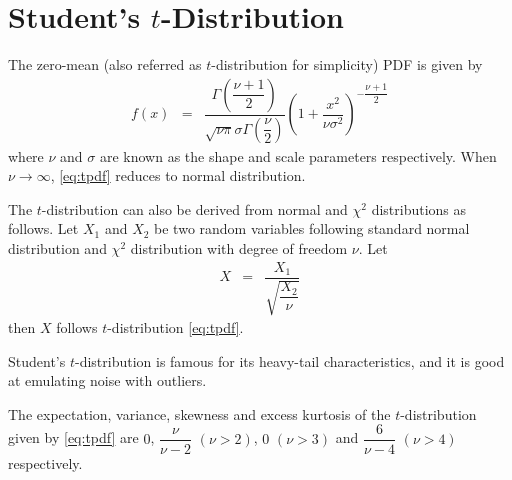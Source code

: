 \section{Student's $t$-Distribution}

The zero-mean  (also referred as $t$-distribution for simplicity) PDF is given by
\begin{eqnarray}
	f(x) &=& \dfrac{\Gamma\left(\dfrac{\nu+1}{2}\right)}{\sqrt{\nu\pi}\sigma\Gamma\left(\dfrac{\nu}{2}\right)}\left(1+\dfrac{x^2}{\nu\sigma^2}\right)^{-\dfrac{\nu+1}{2}} \label{eq:tpdf}
\end{eqnarray}
where $\nu$ and $\sigma$ are known as the shape and scale parameters respectively. When $\nu\rightarrow\infty$, \eqref{eq:tpdf} reduces to normal distribution. 

The $t$-distribution can also be derived from normal and $\chi^2$ distributions as follows. Let $X_1$ and $X_2$ be two random variables following standard normal distribution and $\chi^2$ distribution with degree of freedom $\nu$. Let
\begin{eqnarray}
	X &=& \dfrac{X_1}{\sqrt{\dfrac{X_2}{\nu}}} \nonumber
\end{eqnarray}
then $X$ follows $t$-distribution \eqref{eq:tpdf}.

Student's $t$-distribution is famous for its heavy-tail characteristics, and it is good at emulating noise with outliers.

The expectation, variance, skewness and excess kurtosis of the $t$-distribution given by \eqref{eq:tpdf} are $0$, $\dfrac{\nu}{\nu-2}$ $(\nu>2)$, $0$ $(\nu>3)$ and $\dfrac{6}{\nu-4}$ $(\nu>4)$ respectively.

